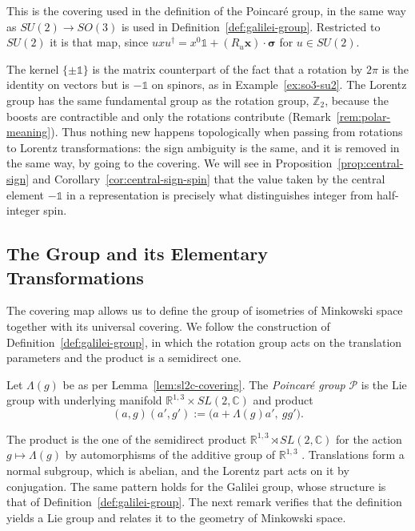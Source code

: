 	\noindent This is the covering used in the definition of the Poincar\'e group, in the same way as $SU(2)\to SO(3)$ is used in Definition~\ref{def:galilei-group}. Restricted to $SU(2)$ it is that map, since $u\hat{x}u^\dagger=x^0\mathbb{1}+(R_u\mathbf{x})\cdot\boldsymbol{\sigma}$ for $u\in SU(2)$.
	
	\begin{remark}\label{rem:covering-spin}
		The kernel $\{\pm\mathbb{1}\}$ is the matrix counterpart of the fact that a rotation by $2\pi$ is the identity on vectors but is $-\mathbb{1}$ on spinors, as in Example~\ref{ex:so3-su2}. The Lorentz group has the same fundamental group as the rotation group, $\mathbb{Z}_2$, because the boosts are contractible and only the rotations contribute (Remark~\ref{rem:polar-meaning}). Thus nothing new happens topologically when passing from rotations to Lorentz transformations: the sign ambiguity is the same, and it is removed in the same way, by going to the covering. We will see in Proposition~\ref{prop:central-sign} and Corollary~\ref{cor:central-sign-spin} that the value taken by the central element $-\mathbb{1}$ in a representation is precisely what distinguishes integer from half-integer spin.
	\end{remark}
	
	\subsection*{The Group and its Elementary Transformations}
	
	The covering map allows us to define the group of isometries of Minkowski space together with its universal covering. We follow the construction of Definition~\ref{def:galilei-group}, in which the rotation group acts on the translation parameters and the product is a semidirect one.
	
	\begin{definition}\label{def:poincare-group}
		Let $\Lambda(g)$ be as per Lemma~\ref{lem:sl2c-covering}. The \emph{Poincar\'e group} $\mathcal{P}$ is the Lie group with underlying manifold $\mathbb{R}^{1,3}\times SL(2,\mathbb{C})$ and product
		\begin{equation}
			(a,g)(a',g'):=\big(a+\Lambda(g)a',\ gg'\big).
		\end{equation}
	\end{definition}
	
	The product is the one of the semidirect product $\mathbb{R}^{1,3}\rtimes SL(2,\mathbb{C})$ for the action $g\mapsto\Lambda(g)$ by automorphisms of the additive group of $\mathbb{R}^{1,3}$ \cite[Chapter 3, \S4]{TODO-BarutRaczka}. Translations form a normal subgroup, which is abelian, and the Lorentz part acts on it by conjugation. The same pattern holds for the Galilei group, whose structure is that of Definition~\ref{def:galilei-group}. The next remark verifies that the definition yields a Lie group and relates it to the geometry of Minkowski space.
	
